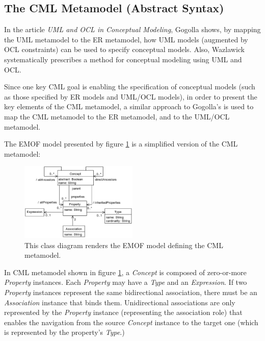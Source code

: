 \subsection{The CML Metamodel (Abstract Syntax)}\label{subsec:metamodel}

In the article \emph{UML and OCL in Conceptual Modeling}, 
Gogolla \cite{gogolla} shows, by mapping the UML \cite{uml} metamodel to the ER \cite{er} metamodel,
how UML models (augmented by OCL \cite{ocl} constraints) can be used to specify conceptual models.
Also, Wazlawick \cite{wazlawick} systematically prescribes a method for conceptual modeling using UML and OCL. 

Since one key CML goal is enabling the specification of conceptual models
(such as those specified by ER models and UML/OCL models),
in order to present the key elements of the CML metamodel,
a similar approach to Gogolla's is used to map the CML metamodel to the ER metamodel,
and to the UML/OCL metamodel.

The EMOF \cite{mof} model presented by figure \ref{fig:metamodel} is a simplified version of the CML metamodel:

\begin{figure}
\centering
\includegraphics[width=0.5\textwidth]{language/diagram-metamodel}
\caption{This class diagram renders the EMOF \cite{mof} model defining the CML metamodel.}
\label{fig:metamodel}
\end{figure}

In CML metamodel shown in figure \ref{fig:metamodel},
a \emph{Concept} is composed of zero-or-more \emph{Property} instances.
Each \emph{Property} may have a \emph{Type} and an \emph{Expression}.
If two \emph{Property} instances represent the same bidirectional association,
there must be an \emph{Association} instance that binds them.
Unidirectional associations are only represented by the \emph{Property} instance (representing the association role)
that enables the navigation from the source \emph{Concept} instance to the target one (which is represented by the property's \emph{Type}.)

